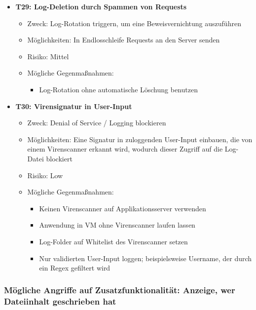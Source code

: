 \documentclass[12pt,DIV14,BCOR10mm,a4paper,parskip=half-,headsepline,headinclude,english,ngerman,bibliography=totocnumbered]{scrreprt}
\begin{document}
\begin{itemize}
  \hypertarget{threat29}{}
  \item \textbf{T29: Log-Deletion durch Spammen von Requests}
  \begin{itemize}
  \item Zweck: Log-Rotation triggern, um eine Beweisvernichtung auszuführen
  \item Möglichkeiten: In Endlosschleife Requests an den Server senden
  \item Risiko: Mittel
  \item Mögliche Gegenmaßnahmen:
    \begin{itemize}
      \item Log-Rotation ohne automatische Löschung benutzen
  	\end{itemize}
  \end{itemize}

  \hypertarget{threat30}{}
  \item \textbf{T30: Virensignatur in User-Input}
  \begin{itemize}
  \item Zweck: Denial of Service / Logging blockieren
  \item Möglichkeiten: Eine Signatur in zuloggenden User-Input einbauen, die von einem Virenscanner erkannt wird, wodurch dieser Zugriff auf die Log-Datei blockiert
  \item Risiko: Low
  \item Mögliche Gegenmaßnahmen:
  \begin{itemize}
  	\item Keinen Virenscanner auf Applikationsserver verwenden
  	\item Anwendung in VM ohne Virenscanner laufen lassen
  	\item Log-Folder auf Whitelist des Virenscanner setzen
  	\item Nur validierten User-Input loggen; beispielsweise Username, der durch ein Regex gefiltert wird
  \end{itemize}
  \end{itemize}
\end{itemize}

\subsubsection{Mögliche Angriffe auf Zusatzfunktionalität: Anzeige, wer Dateiinhalt geschrieben hat}
\end{document}
